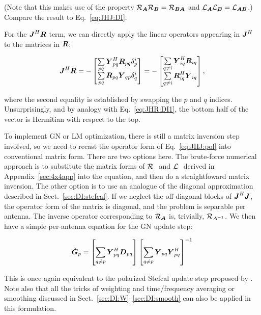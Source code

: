 \documentclass[useAMS,usenatbib]{mn2e}
\newcommand{\mat}[1]{{\bmath{#1}}}
\newcommand{\JJ}{\mat{J}} %
\newcommand{\DD}{\mat{D}}
\newcommand{\RR}{\mat{R}}
\newcommand{\GG}{\mat{G}}
\newcommand{\JHJ}{\JJ^H\JJ} %
\begin{document}
(Note that this makes use of the property $\Rop{\mat{A}}\Rop{\mat{B}}=\Rop{\mat{BA}}$ and 
$\Lop{\mat{A}}\Lop{\mat{B}}=\Lop{\mat{AB}}$.) Compare the result to Eq.~\ref{eq:JHJ:DI}.

For the $\JJ^H\bmath{R}$ term, we can directly apply the linear operators appearing in $\JJ^H$ 
to the matrices in $\bmath{R}$:

\begin{equation}
\JJ^H\bmath{R} = -\Matrix{c}{ 
\sum\limits_{pq} \YY^H_{pq} \RR_{pq} \delta^{i}_p  \\
\sum\limits_{pq} \RR_{pq} \YY_{qp} \delta^{i}_q 
} = -\Matrix{c}{
\sum\limits_{q\ne i} \YY^H_{iq} \RR_{iq} \\
\sum\limits_{q\ne i} \RR^H_{iq} \YY_{iq}  
},
\end{equation}

where the second equality is established by swapping the $p$ and $q$ indices. Unsurprisingly, and by analogy with 
Eq.~\ref{eq:JHR:DI1}, the bottom half of the vector is Hermitian with respect to the top.

To implement GN or LM optimization, there is still a matrix inversion step involved, so we need to recast the operator 
form of Eq.~\ref{eq:JHJ:pol} into conventional matrix form. There are two options here. The brute-force numerical
approach is to substitute the matrix forms of $\mathcal{R}_{{~}}$ and $\mathcal{L}_{{~}}$ derived in Appendix~\ref{sec:4x4app} into the equation, 
and then do a straightfoward matrix inversion. The other option is to use an analogue of the diagonal approximation described in 
Sect.~\ref{sec:DI:stefcal}. If we neglect the off-diagonal blocks of $\JHJ$, the operator form of the matrix is 
diagonal, and the problem is separable per antenna. The inverse operator corresponding to $\Rop{\mat{A}}$ is, 
trivially, $\Rop{\mat{A}^{-1}}$. We then have a simple per-antenna equation for the GN update step:

\begin{equation}
\label{eq:update:DI:diag:pol}
\hat{\GG}_p = \left [ \sum\limits_{q\ne p} \YY^H_{pq} \DD_{pq} \right ] 
\left [ \sum\limits_{q\ne p} \YY_{pq} \YY^H_{pq}  \right ]^{-1}
\end{equation}

This is once again equivalent to the polarized Stefcal update step proposed by \citet{Stefcal}. Note also that all 
the tricks of weighting and time/frequency averaging or smoothing discussed in Sect.~\ref{sec:DI:W}--\ref{sec:DI:smooth} 
can also be applied in this formulation.
\end{document}
